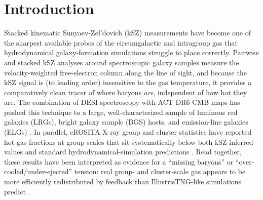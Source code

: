 \documentclass[11pt]{article}
\newcommand{\bind}{\textsc{bind}}
\newcommand{\Mhalo}{M_{200c}}
\newcommand{\Mfive}{M_{500c}}
\begin{document}
\begin{abstract}
($f_{\rm gas}(<\Mfive)$) axis and an outer-gas ($f_{\rm gas}(\Mfive\to\Mhalo)$)
axis, each correlating with its latent direction at $r=0.95$ -- and a companion
ray-traced, field-level analysis shows this splits into just one dominant
gas-ejection direction once projected through the lensing kernel. %
We state
plainly and repeatedly that \bind's ``kSZ'' is this velocity-free optical depth,
not a reconstructed temperature decrement, and discuss what a genuine
$\Delta T_{\rm kSZ}$ comparison would require. The paper's central claim is that
the TNG-like feedback \emph{model space}, not any single parameter choice within
it, is what is in tension with the data.
\end{abstract}

\section{Introduction}\label{sec:intro}

Stacked kinematic Sunyaev-Zel'dovich (kSZ) measurements have become one of the
sharpest available probes of the circumgalactic and intragroup gas that
hydrodynamical galaxy-formation simulations struggle to place correctly.
Pairwise and stacked kSZ analyses around spectroscopic galaxy samples
\citep{schaan21,amodeo21} measure the velocity-weighted free-electron column
along the line of sight, and because the kSZ signal is (to leading order)
insensitive to the gas temperature, it provides a comparatively clean tracer of
where baryons \emph{are}, independent of how hot they are. The combination of
DESI spectroscopy with ACT DR6 CMB maps has pushed this technique to a large,
well-characterized sample of luminous red galaxies (LRGs), bright galaxy sample
(BGS) hosts, and emission-line galaxies (ELGs)
\citep{kszpartI,kszpartII}.
In parallel, eROSITA X-ray group and cluster statistics have reported
hot-gas fractions at group scales that sit systematically below both
kSZ-inferred values and standard hydrodynamical-simulation predictions
\citep{popesso24}. Read together, these results have been interpreted as
evidence for a ``missing baryons'' or ``over-cooled/under-ejected'' tension: real
group- and cluster-scale gas appears to be more efficiently redistributed by
feedback than IllustrisTNG-like simulations predict
\citep{siegel25,kovac25,bigwood24}.
\end{document}
